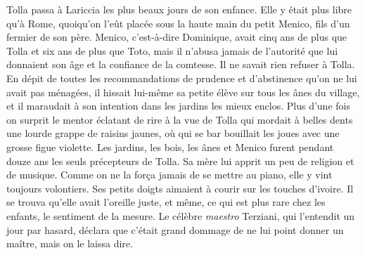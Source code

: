 Tolla passa à Lariccia les plus beaux jours de son enfance. Elle y était plus libre qu’à Rome, quoiqu’on l’eût placée sous la haute main du petit Menico, fils d’un fermier de son père. Menico, c’est-à-dire Dominique, avait cinq ans de plus que Tolla et six ans de plus que Toto, mais il n’abusa jamais de l’autorité que lui donnaient son âge et la confiance de la comtesse. Il ne savait rien refuser à Tolla. En dépit de toutes les recommandations de prudence et d’abstinence qu’on ne lui avait pas ménagées, il hissait lui-même sa petite élève sur tous les ânes du village, et il maraudait à son intention dans les jardins les mieux enclos. Plus d’une fois on surprit le mentor éclatant de rire à la vue de Tolla qui mordait à belles dents une lourde grappe de raisins jaunes, où qui se bar bouillait les joues avec une grosse figue violette. Les jardins, les bois, les ânes et Menico furent pendant douze ans les seuls précepteurs de Tolla. Sa mère lui apprit un peu de religion et de musique. Comme on ne la força jamais de se mettre au piano, elle y vint toujours volontiers. Ses petits doigts aimaient à courir sur les touches d’ivoire. Il se trouva qu’elle avait l’oreille juste, et même, ce qui est plus rare chez les enfants, le sentiment de la mesure. Le célèbre \emph{maestro} Terziani, qui l’entendit un jour par hasard, déclara que c’était grand dommage de ne lui point donner un maître, mais on le laissa dire.


